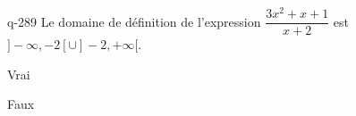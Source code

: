\begin{truefalse}{q-289}
Le domaine de définition de l'expression $\dfrac{3x^2+x+1}{x+2}$ est $]-\infty,-2[\cup ]-2,+\infty[$.
\item* Vrai
\item Faux
\end{truefalse}

